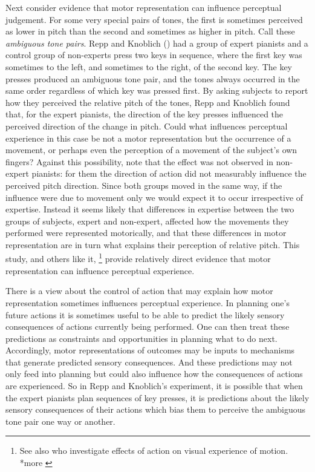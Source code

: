 \documentclass[12pt,\papersize]{extarticle}
\begin{document}
Next consider evidence that motor representation can influence perceptual judgement.  For some very special pairs of tones, the first is sometimes perceived as lower in pitch than the second and sometimes as higher in pitch.  Call these \emph{ambiguous tone pairs}.  Repp and Knoblich (\citeyear{repp:2007_action}) had a group of expert pianists and a control group of non-experts press two keys in sequence, where the first key was sometimes to the left, and sometimes to the right, of the second key.  The key presses produced an ambiguous tone pair, and the tones always occurred in the same order regardless of which key was pressed first.  By asking subjects to report how they perceived the relative pitch of the tones, Repp and Knoblich found that, for the expert pianists, the direction of the key presses influenced the perceived direction of the change in pitch. Could what influences perceptual experience in this case be not a motor representation but the occurrence of a movement, or perhaps even the perception of a movement of the subject's own fingers? Against this possibility, note that the effect was not observed in non-expert pianists: for them the direction of action did not measurably influence the perceived pitch direction. Since both groups moved in the same way, if the influence were due to movement only we would expect it to occur irrespective of expertise. Instead it seems likely that differences in expertise between the two groups of subjects, expert and non-expert, affected how the movements they performed were represented motorically, and that these differences in motor representation are in turn what explains their perception of relative pitch.  This study, and others like it,%
\footnote{
See also \citet{zwickel:2010_interference} who investigate effects of action on visual experience of motion.  *more \citep{schutz-bosbach:2007_perceptual}
}
provide relatively direct evidence that motor representation can influence perceptual experience.

There is a view about the control of action that may explain how motor representation sometimes influences perceptual experience.  In planning one's future actions it is sometimes useful to be able to predict the likely sensory consequences of actions currently being performed.  One can then treat these predictions as constraints and opportunities in planning what to do next.  Accordingly, motor representations of outcomes may be inputs to mechanisms that generate predicted sensory consequences. And these predictions may not only feed into planning but could also influence how the consequences of actions are experienced. So in Repp and Knoblich's experiment, it is possible that when the expert pianists plan sequences of key presses, it is predictions about the likely sensory consequences of their actions which bias them to perceive the ambiguous tone pair one way or another.   
\end{document}
